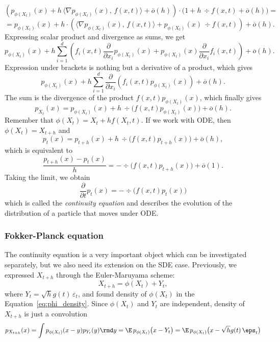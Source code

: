 \[
    \left(p_{\phi(X_t)}(x) + h\, \Big\langle \nabla p_{\phi(X_t)}(x), \, f(x, t) \Big\rangle + \overline{o}(h)\right)\cdot \Big(1 + h\, \div f(x, t) + \overline{o}(h)\Big) = 
\]
\[
    = p_{\phi(X_t)}(x) + h \cdot \left(\Big\langle \nabla p_{\phi(X_t)}(x), \, f(x, t) \Big\rangle + p_{\phi(X_t)}(x) \, \div f(x, t)\right) + \overline{o}(h).
\]
Expressing scalar product and divergence as sums, we get
\[
    p_{\phi(X_t)}(x) + h\sum\limits_{i = 1}^{d}\left( f_i(x, t)\frac{\partial}{\partial x_i} p_{\phi(X_t)}(x) + p_{\phi(X_t)}(x) \frac{\partial}{\partial x_i} f_i(x, t) \right) + \overline{o}(h).
\]
Expression under brackets is nothing but a derivative of a product, which gives
\[
    p_{\phi(X_t)}(x) + h\sum\limits_{i = 1}^{d} \frac{\partial}{\partial x_i} \left(f_i(x, t) p_{\phi(X_t)}(x)\right) + \overline{o}(h).
\]
The sum is the divergence of the product $f(x, t)p_{\phi(X_t)}(x)$, which finally gives
\begin{equation}\label{eq:phi_density}
    p_{X_t}(x) = p_{\phi(X_t)}(x) + h\,\div\Big(f(x, t) p_{\phi(X_t)}(x)\Big) + \overline{o}(h).    
\end{equation}
Remember that $\phi(X_t) = X_t + h f(X_t, t)$. If we work with ODE, then $\phi(X_t) = X_{t + h}$ and
\[
    p_{t}(x) = p_{t + h}(x) + h \, \div\Big(f(x, t) p_{t + h}(x)\Big) + \overline{o}(h),
\]
which is equivalent to
\[
    \frac{p_{t + h}(x) - p_t(x)}{h} = -\div\Big(f(x, t)p_{t + h}(x)\Big) + \overline{o}(1).
\]
Taking the limit, we obtain
\begin{equation}\label{eq:continuity}
    \boxed{\frac{\partial}{\partial t} p_t(x) = -\div \Big(f(x, t) p_{t}(x)\Big)}
\end{equation}
which is called the \emph{continuity equation} and describes the evolution of the distribution of a particle that moves under ODE.

\subsubsection{Fokker-Planck equation}
The continuity equation is a very important object which can be investigated separately, but we also need its extension on the SDE case. Previously, we expressed $X_{t + h}$ through the Euler-Maruyama scheme:
\[
    X_{t + h} = \phi(X_t) + Y_t,
\]
where $Y_t = \sqrt{h} g(t) \, \varepsilon_t$, and found density of $\phi(X_t)$ in the Equation~\ref{eq:phi_density}. Since $\phi(X_t)$ and $Y_t$ are independent, density of $X_{t + h}$ is just a convolution
\[
    p_{X_{t + h}}(x) = \int p_{\phi(X_t)}(x - y) p_{Y_t}(y) \rmd y = \E\, p_{\phi(X_t)}\big(x - Y_t\big) = \E\, p_{\phi(X_t)}\big(x - \sqrt{h} g(t)\,\eps_t\big)
\]

